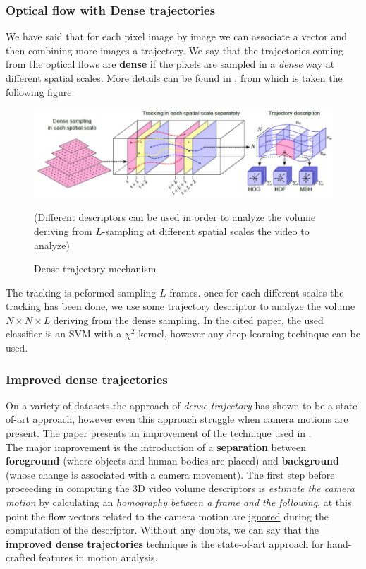 \subsubsection{Optical flow with Dense trajectories}
We have said that for each pixel image by image we can associate a vector and then combining more images a trajectory. We say that the trajectories coming from the optical flows are \textbf{dense} if the pixels are sampled in a \textit{dense} way at different spatial scales. More details can be found in \cite{dense}, from which is taken the following figure:

\begin{figure}[h]
    \centering
    \includegraphics[scale=0.6]{img/densetraj.png}
    \caption{Dense trajectory mechanism} (Different descriptors can be used in order to analyze the volume deriving from $L$-sampling at different spatial scales the video to analyze)
\end{figure}

The tracking is peformed sampling $L$ frames. once for each different scales the tracking has been done, we use some trajectory descriptor to analyze the volume $N\times{N}\times{L}$ deriving from the dense sampling. In the cited paper, the used classifier is an SVM with a $\chi^2$-kernel, however any deep learning techinque can be used.

\subsubsection{Improved dense trajectories}
On a variety of datasets the approach of \textit{dense trajectory} has shown to be a state-of-art approach, however even this approach struggle when camera motions are present. The paper \cite{wang2013action} presents an improvement of the technique used in \cite{dense}.\\
The major improvement is the introduction of a \textbf{separation} between \textbf{foreground} (where objects and human bodies are placed) and \textbf{background} (whose change is  associated with a camera movement). The first step before proceeding in computing the 3D video volume descriptors is \textit{estimate the camera motion} by calculating an \textit{homography between a frame and the following}, at this point the flow vectors related to the camera motion are \underline{ignored} during the computation of the descriptor. Without any doubts, we can say that the \textbf{improved dense trajectories} technique is the state-of-art approach for hand-crafted features in motion analysis.

